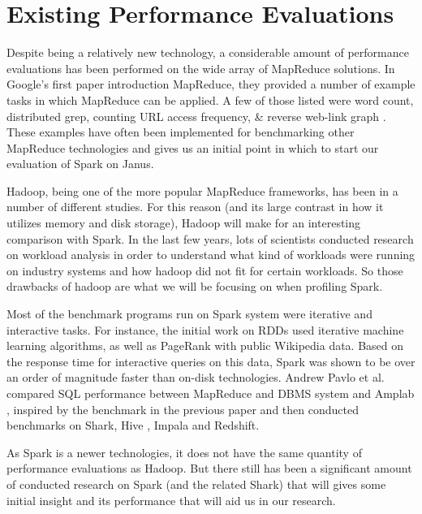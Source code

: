 \documentclass{article}
\begin{document}

\section*{Existing Performance Evaluations }
Despite being a relatively new technology, a considerable amount of performance
evaluations has been performed on the wide array of MapReduce solutions.
In Google's first paper introduction MapReduce, they provided a number of
example tasks in which MapReduce can be applied. A few of those listed were
word count, distributed grep, counting URL access frequency, \& reverse web-link
graph \citep{dean-mapreduce}. These examples have often been implemented for
benchmarking other MapReduce technologies and gives us an initial point in which
to start our evaluation of Spark on Janus.

Hadoop, being one of the more popular MapReduce frameworks, has been in a
number of different studies. For this reason (and its large contrast in how
it utilizes memory and disk storage), Hadoop will make for an interesting
comparison with Spark. In the last few years, lots of scientists conducted research on workload analysis\citep{yanpei} in order to understand what kind of workloads were running on industry systems and how hadoop did not fit for certain workloads. So those drawbacks of hadoop are what we will be focusing on when profiling Spark.

Most of the benchmark programs run on Spark system were iterative and
interactive tasks. For instance, the initial work on RDDs \citep{zaharia_rdd}
used iterative machine learning algorithms, as well as PageRank with public
Wikipedia data. Based on the response time for interactive queries on
this data, Spark was shown to be over an order of magnitude faster than
on-disk technologies.
Andrew Pavlo et al. \cite{andrew} compared SQL performance between
MapReduce and DBMS system and Amplab \citep{amplab_bench}, inspired by the
benchmark in the previous paper and then conducted benchmarks on Shark,
Hive \citep{ashish}, Impala and Redshift.


As Spark is a newer technologies, it does not have the same quantity of
performance evaluations as Hadoop. But there still has been a significant
amount of conducted research on Spark (and the related Shark) that will gives
some initial insight and its performance that will aid us in our research.
\end{document}
